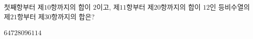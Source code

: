첫째항부터 제$10$항까지의 합이 $2$이고, 제$11$항부터 제$20$항까지의 합이 $12$인 등비수열의 제$21$항부터 제$30$항까지의 합은?
\begin{choices32}{$64$}{$72$}{$80$}{$96$}{$114$}\end{choices32}
